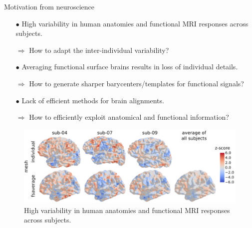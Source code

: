 \documentclass{beamer}
\begin{document}
\begin{frame}{Motivation from neuroscience}
\scriptsize
\begin{itemize}
  \setlength\itemsep{0.3cm}
  \item[$\bullet$] High variability in human anatomies and functional MRI responses across subjects.

  $\Rightarrow$ How to adapt the inter-individual variability?

  \item[$\bullet$] Averaging functional surface brains results in loss of individual details.

  $\Rightarrow$ How to generate sharper barycenters/templates for functional signals?

  \item[$\bullet$] Lack of efficient methods for brain alignments.

  $\Rightarrow$ How to efficiently exploit anatomical and functional information?
\end{itemize}
\begin{figure}
  \centering
  \includegraphics[width=1.\linewidth, keepaspectratio=true]{OT_new/intro_variation.pdf}
  \caption*{\scriptsize{High variability in human anatomies and functional MRI responses across subjects.}}
\end{figure}
\end{frame}
\end{document}
